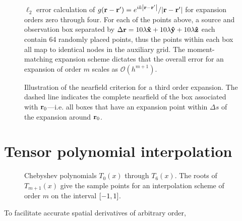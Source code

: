 \begin{figure}
  \centering
  
  \caption{\label{fig:grid convergence} $\ell_2$ error calculation of $g(\vb{r} - \vb{r}') = e^{i k \abs{\vb{r} - \vb{r}'}}/{\abs{\vb{r} - \vb{r}'}}$ for expansion orders zero through four.
    For each of the points above, a source and observation box separated by $\Delta \vb{r} = 10\lambda \vu{x} + 10 \lambda \vu{y} + 10 \lambda \vu{z}$ each contain 64 randomly placed points, thus the points within each box all map to identical nodes in the auxiliary grid.
    The moment-matching expansion scheme dictates that the overall error for an expansion of order $m$ scales as $\mathcal{O}(h^{m + 1})$.
  }
\end{figure}

\begin{figure}
  \centering
  
  \caption{\label{fig:nearfield criterion}Illustration of the nearfield criterion for a third order expansion.
    The dashed line indicates the complete nearfield of the box associated with \textcolor{cbblue}{$\vb{r}_0$}---i.e. all boxes that have an expansion point within $\Delta s$ of the expansion around \textcolor{cbblue}{$\vb{r}_0$}.
  }
\end{figure}

\section{Tensor polynomial interpolation}

\begin{figure}
  \centering
  \caption{\label{fig:chebyshev polynomials} Chebyshev polynomials $T_0(x)$ through $T_6(x)$.
    The roots of $T_{m + 1}(x)$ give the sample points for an interpolation scheme of order $m$ on the interval $\qty[-1, 1]$.
  }
\end{figure}

To facilitate accurate spatial derivatives of arbitrary order,


